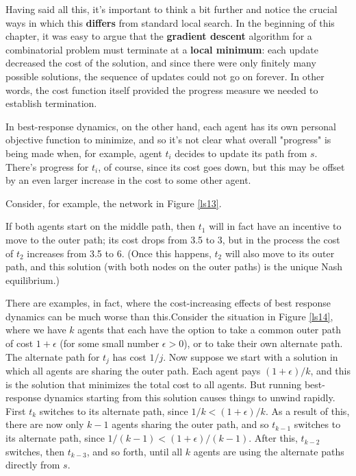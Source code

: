 Having said all this, it’s important to think a bit further and notice the crucial ways in which this \textbf{differs} from standard local search. In the beginning of this chapter, it was easy to argue that the \textbf{gradient descent} algorithm for a combinatorial problem must terminate at a \textbf{local minimum}: each update decreased the cost of the solution, and since there were only finitely many possible solutions, the sequence of updates could not go on forever. In other words, the cost function itself provided the progress measure we needed to establish termination.

In best-response dynamics, on the other hand, each agent has its own personal objective function to minimize, and so it’s not clear what overall "progress" is being made when, for example, agent $t_i$ decides to update its path from $s$. There’s progress for $t_i$, of course, since its cost goes down, but this may be offset by an even larger increase in the cost to some other agent. 

Consider, for example, the network in Figure \ref{ls13}. 

\label{ls13}

If both agents start on the middle path, then $t_1$ will in fact have an incentive to move to the outer path; its cost drops from 3.5 to 3, but in the process the cost of $t_2$ increases from 3.5 to 6. (Once this happens, $t_2$ will also move to its outer path, and this solution (with both nodes on the outer paths) is the unique Nash equilibrium.)

There are examples, in fact, where the cost-increasing effects of best response dynamics can be much worse than this.\label{ls14}Consider the situation in Figure \ref{ls14}, where we have $k$ agents that each have the option to take a common outer path of cost $1+ \epsilon$ (for some small number $\epsilon> 0$), or to take their own alternate path. The alternate path for $t_j$ has cost $1/j$. Now suppose we start with a solution in which all agents are sharing the outer path. Each agent pays $(1+ \epsilon)/k$, and this is the solution that minimizes the total cost to all agents. But running best-response dynamics starting from this solution causes things to unwind rapidly. First $t_k$ switches to its alternate path, since $1/k <(1+ \epsilon)/k$. As a result of this, there are now only $k-1 $ agents sharing the outer path, and so $t_{k-1}$ switches to its alternate path, since $1/(k-1)<(1+ \epsilon)/(k-1)$. After this, $t_{k-2}$ switches, then $t_{k-3}$, and so forth, until all $k$ agents are using the alternate paths directly from $s$.

